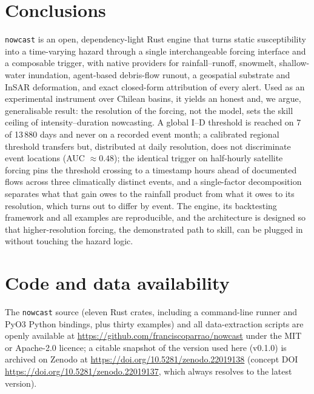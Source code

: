 \documentclass[authoryear,preprint,review,12pt]{elsarticle}
\begin{document}
\section{Conclusions}

\texttt{nowcast} is an open, dependency-light Rust engine that turns static
susceptibility into a time-varying hazard through a single interchangeable forcing
interface and a composable trigger, with native providers for rainfall--runoff,
snowmelt, shallow-water inundation, agent-based debris-flow runout, a geospatial
substrate and InSAR deformation, and exact closed-form attribution of every alert.
Used as an experimental instrument over Chilean basins, it yields an honest and,
we argue, generalisable result: the resolution of the forcing, not the
model, sets the skill ceiling of intensity--duration nowcasting. A global I--D
threshold is reached on 7 of 13\,880 days and never on a recorded event month; a calibrated regional threshold transfers
but, distributed at daily resolution, does not discriminate event locations
(AUC $\approx 0.48$); the identical trigger on half-hourly satellite forcing pins
the threshold crossing to a timestamp hours ahead of documented flows across three
climatically distinct events, and a single-factor decomposition separates what that
gain owes to the rainfall product from what it owes to its resolution, which turns
out to differ by event. The engine, its backtesting framework and all
examples are reproducible, and the architecture is designed so that
higher-resolution forcing, the demonstrated path to skill, can be plugged in
without touching the hazard logic.

\section*{Code and data availability}

The \texttt{nowcast} source (eleven Rust crates, including a command-line runner and
PyO3 Python bindings, plus thirty examples) and all data-extraction scripts
are openly available at \url{https://github.com/franciscoparrao/nowcast} under the
MIT or Apache-2.0 licence; a citable snapshot of the version used here (v0.1.0) is archived on
Zenodo at \url{https://doi.org/10.5281/zenodo.22019138} (concept DOI
\url{https://doi.org/10.5281/zenodo.22019137}, which always resolves to the
latest version). 
\end{document}
